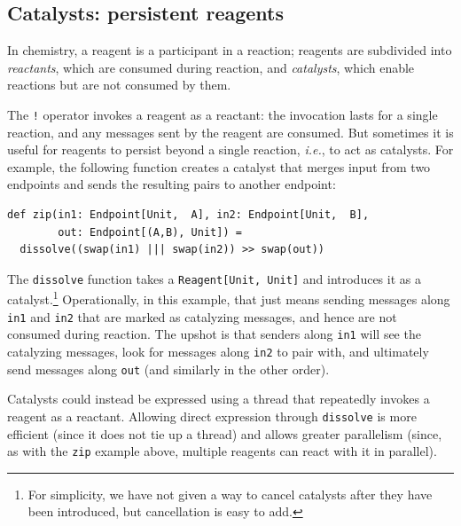 \documentclass[preprint,nocopyrightspace]{sigplanconf}
\begin{document}

\subsection{Catalysts: persistent reagents}
\label{sec:catalysts}

In chemistry, a reagent is a participant in a reaction; reagents are
subdivided into \emph{reactants}, which are consumed during reaction, and
\emph{catalysts}, which enable reactions but are not consumed by them.

The \lstinline{!} operator invokes a reagent as a reactant: the invocation
lasts for a single reaction, and any messages sent by the reagent are
consumed.  But sometimes it is useful for reagents to persist beyond a single
reaction, \emph{i.e.}, to act as catalysts.  For example, the following
function creates a catalyst that merges input from two endpoints and sends the
resulting pairs to another endpoint:
\begin{lstlisting}
def zip(in1: Endpoint[Unit,  A], in2: Endpoint[Unit,  B], 
        out: Endpoint[(A,B), Unit]) = 
  dissolve((swap(in1) ||| swap(in2)) >> swap(out))
\end{lstlisting}
The \lstinline{dissolve} function takes a \lstinline{Reagent[Unit, Unit]} and
introduces it as a catalyst.\footnote{For simplicity, we have not given a way
  to cancel catalysts after they have been introduced, but cancellation is
  easy to add.}  Operationally, in this example, that just means sending
messages along \lstinline{in1} and \lstinline{in2} that are marked as
catalyzing messages, and hence are not consumed during reaction.  The upshot
is that senders along \lstinline{in1} will see the catalyzing messages, look
for messages along \lstinline{in2} to pair with, and ultimately send messages
along \lstinline{out} (and similarly in the other order).

Catalysts could instead be expressed using a thread that repeatedly invokes a
reagent as a reactant.  Allowing direct expression through
\lstinline{dissolve} is more efficient (since it does not tie up a thread) and
allows greater parallelism (since, as with the \lstinline{zip} example above,
multiple reagents can react with it in parallel).
\end{document}

